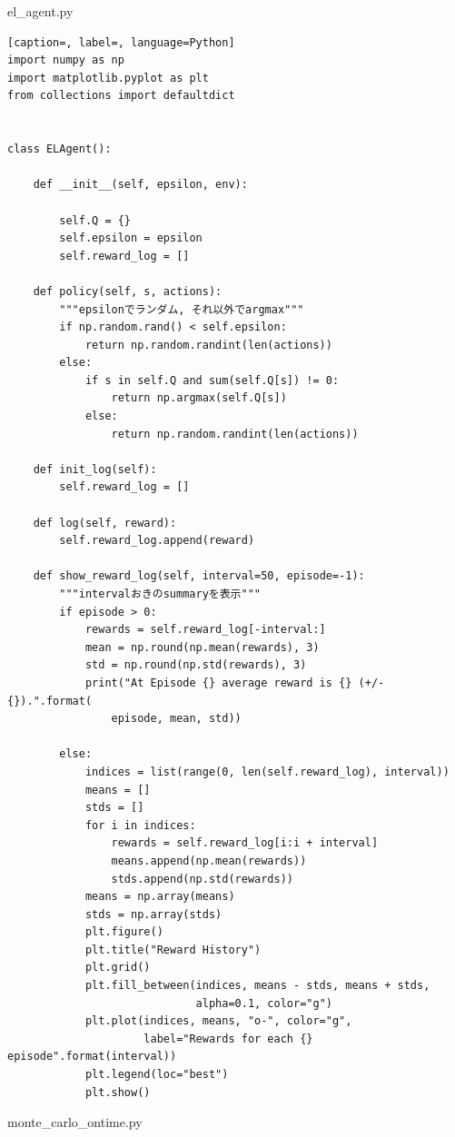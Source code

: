 \documentclass[a4paper,12pt]{jsreport}
\theoremstyle{definition}
\begin{document}
el\_agent.py
\begin{lstlisting}[caption=, label=, language=Python]
import numpy as np
import matplotlib.pyplot as plt
from collections import defaultdict


class ELAgent():

    def __init__(self, epsilon, env):

        self.Q = {}
        self.epsilon = epsilon
        self.reward_log = []

    def policy(self, s, actions):
        """epsilonでランダム, それ以外でargmax"""
        if np.random.rand() < self.epsilon:
            return np.random.randint(len(actions))
        else:
            if s in self.Q and sum(self.Q[s]) != 0:
                return np.argmax(self.Q[s])
            else:
                return np.random.randint(len(actions))

    def init_log(self):
        self.reward_log = []

    def log(self, reward):
        self.reward_log.append(reward)

    def show_reward_log(self, interval=50, episode=-1):
        """intervalおきのsummaryを表示"""
        if episode > 0:
            rewards = self.reward_log[-interval:]
            mean = np.round(np.mean(rewards), 3)
            std = np.round(np.std(rewards), 3)
            print("At Episode {} average reward is {} (+/-{}).".format(
                episode, mean, std))

        else:
            indices = list(range(0, len(self.reward_log), interval))
            means = []
            stds = []
            for i in indices:
                rewards = self.reward_log[i:i + interval]
                means.append(np.mean(rewards))
                stds.append(np.std(rewards))
            means = np.array(means)
            stds = np.array(stds)
            plt.figure()
            plt.title("Reward History")
            plt.grid()
            plt.fill_between(indices, means - stds, means + stds,
                             alpha=0.1, color="g")
            plt.plot(indices, means, "o-", color="g",
                     label="Rewards for each {} episode".format(interval))
            plt.legend(loc="best")
            plt.show()

\end{lstlisting}
monte\_carlo\_ontime.py
\end{document}
